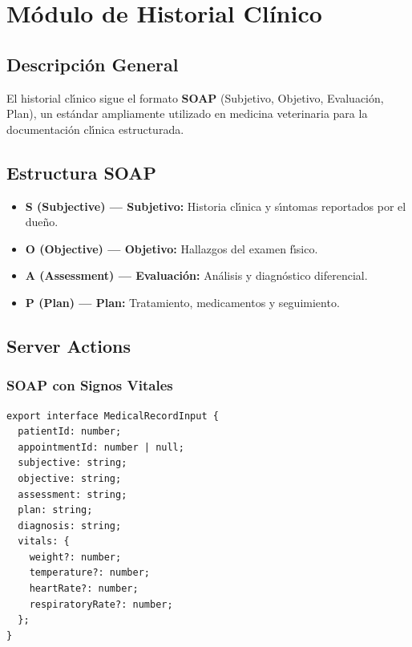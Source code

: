 \chapter{M\'odulo de Historial Cl\'inico}

\section{Descripci\'on General}

El historial cl\'{\i}nico sigue el formato \textbf{SOAP} (Subjetivo,
Objetivo, Evaluaci\'on, Plan), un est\'andar ampliamente utilizado en
medicina veterinaria para la documentaci\'on cl\'{\i}nica estructurada.

\section{Estructura SOAP}

\begin{itemize}[leftmargin=*]
    \item \textbf{S (Subjective) --- Subjetivo:} Historia cl\'{\i}nica y
          s\'{\i}ntomas reportados por el due\~no.
    \item \textbf{O (Objective) --- Objetivo:} Hallazgos del examen f\'{\i}sico.
    \item \textbf{A (Assessment) --- Evaluaci\'on:} An\'alisis y diagn\'ostico
          diferencial.
    \item \textbf{P (Plan) --- Plan:} Tratamiento, medicamentos y seguimiento.
\end{itemize}

\section{Server Actions}

\subsection{SOAP con Signos Vitales}

\begin{lstlisting}[style=typescript, caption=Interfaz MedicalRecordInput]
export interface MedicalRecordInput {
  patientId: number;
  appointmentId: number | null;
  subjective: string;
  objective: string;
  assessment: string;
  plan: string;
  diagnosis: string;
  vitals: {
    weight?: number;
    temperature?: number;
    heartRate?: number;
    respiratoryRate?: number;
  };
}
\end{lstlisting}

